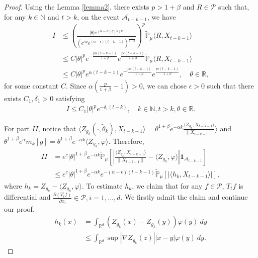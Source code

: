 \documentclass[12pt, a4paper]{amsart}
\theoremstyle{definition}
\numberwithin{equation}{section}
\begin{document}
\begin{proof}
    Using the Lemma \ref{lemma2}, there exists $p>1+\beta$ and $R \in \mathcal{P}$ such that, for any $k\in \mathbb{N}$ and $t>k$, on the event $\mathcal{A}_{t-k-1}$, we have 
    \begin{align*}
        I&\leq \left(\frac{|\theta|e^{(\alpha-\kappa(g)b)k}}{(e^{\alpha k}e^{(\alpha-\epsilon)(t-k-1)})^\frac{1}{1+\beta}}\right)^p\mathbb{\tilde{P}}_{\mu}\langle R,X_{t-k-1}\rangle\\
        &\leq C |\theta|^p e^{-\frac{p\alpha(t-k-1)}{1+\beta}}e^{\frac{p\epsilon(t-k-1)}{1+\beta}}\mathbb{\tilde{P}}_{\mu}\langle R,X_{t-k-1}\rangle\\
        &\leq C |\theta|^p e^{\alpha(t-k-1)}e^{-\frac{p\alpha(t-k-1)}{1+\beta}}e^{\frac{p\epsilon(t-k-1)}{1+\beta}},\quad \theta\in \mathbb{R},
    \end{align*}
    for some constant $C$. Since $\alpha(\frac{p}{1+\beta}-1)>0$, we can chose $\epsilon>0$ such that there exists $C_1,\delta_1>0$ satisfying  
    \begin{align}
        I\leq C_1|\theta|^p e^{-\delta_1(t-k)}, \quad k\in \mathbb{N}, t>k, \theta \in \mathbb{R}.\label{lemma31q}
    \end{align}
    
    For part $II$, notice that $\langle Z_{g_k}(\cdot,\tilde{\theta}_k),X_{t-k-1}\rangle=\theta^{1+\beta}e^{-\alpha k}\frac{\langle Z_{g_k},X_{t-k-1}\rangle}{\|X_{t-k-1}\|} \rangle$ and $\theta^{1+\beta}e^{\alpha}m_k[g]=\theta^{1+\beta}e^{-\alpha k}\langle Z_{g_k},\varphi\rangle$. Therefore,
\begin{align}
    II&=e^c|\theta|^{1+\beta}e^{-\alpha k}\mathbb{\tilde{P}}_{\mu}\left[\left|\frac{\langle Z_{g_k},X_{t-k-1}\rangle}{\|X_{t-k-1}\|}-\langle Z_{g_k},\varphi\rangle\right|\mathbf{1}_{\mathcal{A}_{t-k-1}}\right]\nonumber\\
    &\leq e^c|\theta|^{1+\beta}e^{-\alpha k}e^{-(\alpha-\epsilon)(t-k-1)}\mathbb{\tilde{P}}_{\mu}\left[\left|\langle h_k,X_{t-k-1}\rangle\right|\right],\label{II1}
\end{align}
    where $h_k=Z_{g_k}-\langle Z_{g_k}, \varphi\rangle$. To estimate $h_k$, we claim that for any $f \in \mathcal{P}$, $T_t f$ is differential and $\frac{\partial (T_t f)}{\partial x_i} \in \mathcal{P}, i=1,...,d$. We firstly admit the claim and continue our proof.
    \begin{align*}
        h_k(x)&=\int_{\mathbb{R}^d}(Z_{g_k}(x)-Z_{g_k}(y))\varphi(y)~dy\\
        &\leq\int_{\mathbb{R}^d} \sup|\nabla Z_{g_k}(z)||x-y|\varphi(y)~dy.
    \end{align*}
    

\end{proof}
\end{document}

